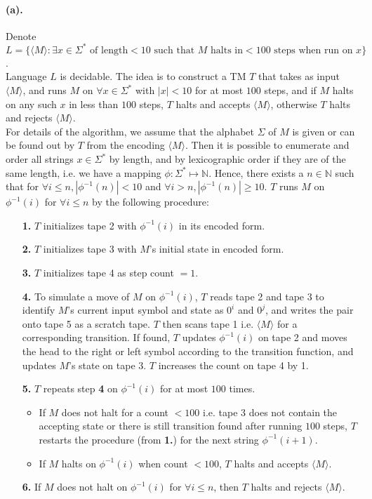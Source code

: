 \documentclass[12pt]{article}
\begin{document}
\paragraph*{(a).} Denote \(L = \{\langle M \rangle : \exists x \in \Sigma^* \text{ of length} < 10 \text{ such that } M \text{ halts in} < 100 \text{ steps when run on } x\}\).\\ 
Language \(L\) is decidable. The idea is to construct a TM \(T\) that takes as input \(\langle M \rangle\), and runs \(M\) on \(\forall x \in \Sigma^*\) with \(|x| < 10\) for at most \(100\) steps, and if \(M\) halts on any such \(x\) in less than \(100\) steps, \(T\) halts and accepts \(\langle M \rangle\), otherwise \(T\) halts and rejects \(\langle M \rangle\).\\
For details of the algorithm, we assume that the alphabet \(\Sigma\) of \(M\) is given or can be found out by \(T\) from the encoding \(\langle M \rangle\). Then it is possible to enumerate and order all strings \(x \in \Sigma^*\) by length, and by lexicographic order if they are of the same length, i.e. we have a mapping \(\phi : \Sigma^* \mapsto \mathbb{N}\). Hence, there exists a \(n \in \mathbb{N}\) such that for \(\forall i \leq n, |\phi^{-1}(n)| < 10\) and \(\forall i > n,  |\phi^{-1}(n)| \geq 10\). \(T\) runs \(M\) on \(\phi^{-1}(i)\) for \(\forall i \leq n \) by the following procedure:
\begin{enumerate}
  \item[\textbf{1.}] \(T\) initializes tape 2 with \(\phi^{-1}(i)\) in its encoded form.
  \item[\textbf{2.}] \(T\) initializes tape 3 with \(M\)'s initial state in encoded form.
  \item[\textbf{3.}] \(T\) initializes tape 4 as step count \(= 1\).
  \item[\textbf{4.}] To simulate a move of \(M\) on \(\phi^{-1}(i)\), \(T\) reads tape 2 and tape 3 to identify \(M\)'s current input symbol and state as \(0^i\) and \(0^j\), and writes the pair onto tape 5 as a scratch tape. \(T\) then scans tape 1 i.e. \(\langle M \rangle\) for a corresponding transition. If found, \(T\) updates \(\phi^{-1}(i)\) on tape 2 and moves the head to the right or left symbol according to the transition function, and updates \(M\)'s state on tape 3. \(T\) increases the count on tape 4 by 1. 
  \item[\textbf{5.}] \(T\) repeats step \textbf{4} on \(\phi^{-1}(i)\) for at most \(100\) times. 
  \begin{itemize}
    \item If \(M\) does not halt for a count \(< 100\) i.e. tape 3 does not contain the accepting state or there is still transition found after running \(100\) steps, \(T\) restarts the procedure (from \textbf{1.}) for the next string \(\phi^{-1}(i+1)\).
    \item If \(M\) halts on \(\phi^{-1}(i)\) when count \(< 100\), \(T\) halts and accepts \(\langle M \rangle\). 
  \end{itemize} 
  \item[\textbf{6.}] If \(M\) does not halt on \(\phi^{-1}(i)\) for \(\forall i \leq n\), then \(T\) halts and rejects \(\langle M \rangle\).
\end{enumerate}
\end{document}
